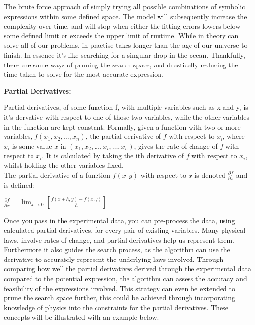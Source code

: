 \documentclass{article}
\begin{document}
The brute force approach of simply trying all possible combinations of symbolic expressions within some defined space. The model will subsequently increase the complexity over time, and will stop when either the fitting errors lowers below some defined limit or exceeds the upper limit of runtime. While in theory can solve all of our problems, in practise takes longer than the age of our universe to finish. In essence it's like searching for a singular drop in the ocean. Thankfully, there are some ways of pruning the search space, and drastically reducing the time taken to solve for the most accurate expression. \\ 

\begin{center} 
  \textbf {\Large Partial Derivatives:}
\end{center}

Partial derivatives, of some function f, with multiple variables such as x and y, is it's dervative with respect to one of those two variables, while the other variables in the function are kept constant. Formally, given a function with two or more variables, $f(x_1, x_2, \ldots, x_n) $, the partial derivative of $f$ with respect to $x_i$, where $x_i$ is some value $x$ in $(x_1, x_2, \ldots, x_i, \ldots, x_n)$, gives the rate of change of $f$ with respect to $x_i$. It is calculated by taking the ith derivative of $f$ with respect to $x_i$, whilst holding the other variables fixed. \cite{Stewart2012} \cite{Smith2012} \\

The partial derivative of a function $f(x,y)$ with respect to $x$ is denoted $\frac{\partial f}{\partial x}$ \cite{Kelly2021} and is defined: \\ 

\begin{center}

  $\frac{\partial f}{\partial x} = \lim_{h \to 0} \left[ \frac{f(x+h, y) - f(x,y)}{h} \right]$
\end{center}


Once you pass in the experimental data, you can pre-process the data, using calculated partial derivatives, for every pair of existing variables. Many physical laws, involve rates of change, and partial
derivatives help us represent them. Furthermore it also guides the search process, as the algorithm can
use the derivative to accurately represent the underlying laws involved. Through comparing how well
the partial derivatives derived through the experimental data compared to the potential expression,
the algorithm can assess the accuracy and feasibility of the expressions involved. This strategy can
even be extended to prune the search space further, this could be achieved through incorporating
knowledge of physics into the constraints for the partial derivatives. These concepts will be illustrated
with an example below.\\
\end{document}
